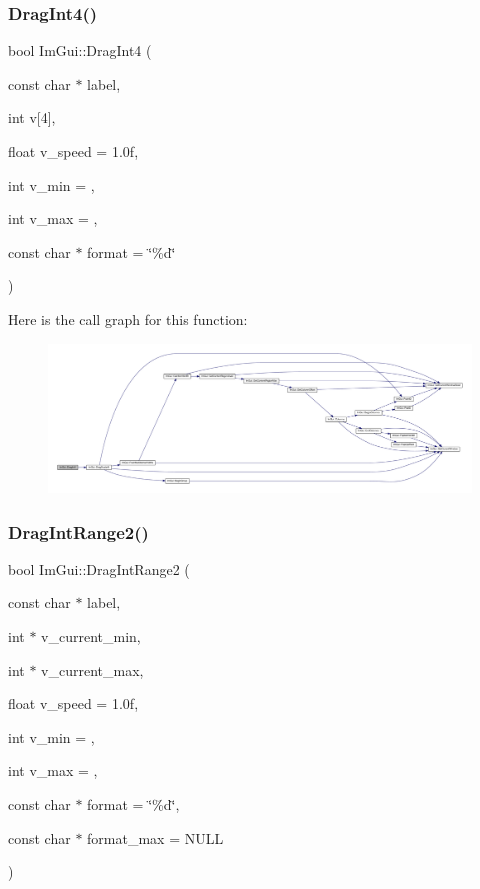 \subsubsection{\texorpdfstring{Drag\+Int4()}{DragInt4()}}
{\footnotesize\ttfamily bool Im\+Gui\+::\+Drag\+Int4 (\begin{DoxyParamCaption}\item[{const char $\ast$}]{label,  }\item[{int}]{v\mbox{[}4\mbox{]},  }\item[{float}]{v\+\_\+speed = {\ttfamily 1.0f},  }\item[{int}]{v\+\_\+min = {},  }\item[{int}]{v\+\_\+max = {},  }\item[{const char $\ast$}]{format = {\ttfamily \char`\"{}\%d\char`\"{}} }\end{DoxyParamCaption})}

Here is the call graph for this function\+:
\nopagebreak
\begin{figure}[H]
\begin{center}
\leavevmode
\includegraphics[width=350pt]{namespace_im_gui_a67acd6e50be3c7091fbc4c21d829e2e0_cgraph}
\end{center}
\end{figure}
\mbox{\label{namespace_im_gui_ae3c5fcb2ff6c529d518a646a97a65186}} 
\subsubsection{\texorpdfstring{Drag\+Int\+Range2()}{DragIntRange2()}}
{\footnotesize\ttfamily bool Im\+Gui\+::\+Drag\+Int\+Range2 (\begin{DoxyParamCaption}\item[{const char $\ast$}]{label,  }\item[{int $\ast$}]{v\+\_\+current\+\_\+min,  }\item[{int $\ast$}]{v\+\_\+current\+\_\+max,  }\item[{float}]{v\+\_\+speed = {\ttfamily 1.0f},  }\item[{int}]{v\+\_\+min = {},  }\item[{int}]{v\+\_\+max = {},  }\item[{const char $\ast$}]{format = {\ttfamily \char`\"{}\%d\char`\"{}},  }\item[{const char $\ast$}]{format\+\_\+max = {\ttfamily NULL} }\end{DoxyParamCaption})}


